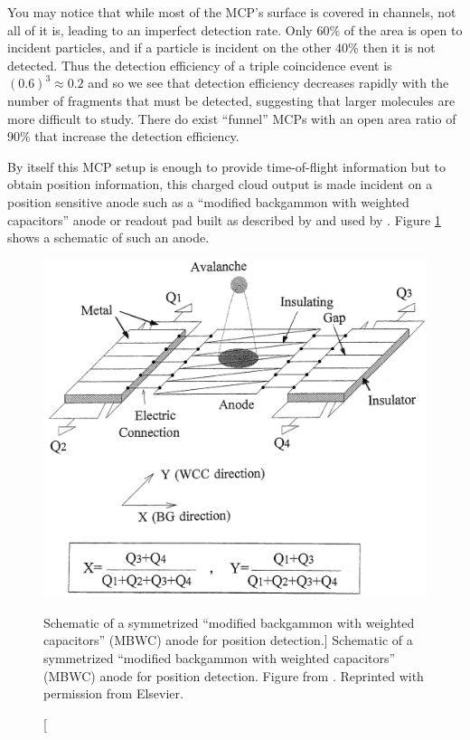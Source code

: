 You may notice that while most of the MCP's surface is covered in channels, not all of it is, leading to an imperfect detection rate. Only 60\% of the area is open to incident particles, and if a particle is incident on the other 40\% then it is not detected. Thus the detection efficiency of a triple coincidence event is $(0.6)^3 \approx 0.2$ and so we see that detection efficiency decreases rapidly with the number of fragments that must be detected, suggesting that larger molecules are more difficult to study. There do exist ``funnel'' MCPs with an open area ratio of 90\% that increase the detection efficiency.

By itself this MCP setup is enough to provide time-of-flight information but to obtain position information, this charged cloud output is made incident on a position sensitive anode such as a ``modified backgammon with weighted capacitors'' anode or readout pad built as described by \citet{Veshapidze02} and used by \citet{Ramadhan16}. Figure \ref{fig:MBWC} shows a schematic of such an anode.

\begin{figure}
  \centering
  \includegraphics[width=\textwidth]{gfx/MBWC}
  \caption
  [Schematic of a symmetrized ``modified backgammon with weighted capacitors'' (MBWC) anode for position detection.]
  {Schematic of a symmetrized ``modified backgammon with weighted capacitors'' (MBWC) anode for position detection. Figure from \citet{Mizogawa02}. Reprinted with permission from Elsevier.}
  \label{fig:MBWC}
\end{figure}


